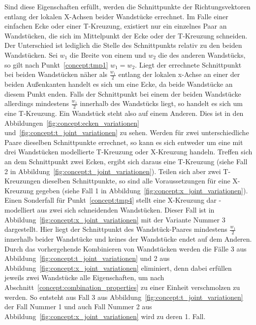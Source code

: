 Sind diese Eigenschaften erfüllt, werden die Schnittpunkte der Richtungsvektoren entlang der lokalen X-Achsen beider Wandstücke errechnet.
Im Falle einer einfachen Ecke oder einer T-Kreuzung, existiert nur ein einzelnes Paar an Wandstücken, die sich im Mittelpunkt der Ecke oder der T-Kreuzung schneiden.
Der Unterschied ist lediglich die Stelle des Schnittpunkts relativ zu den beiden Wandstücken.
Sei \(w_1\) die Breite von einem und \(w_2\) die des anderen Wandstücks, so gilt nach Punkt~\ref{concept:tmp1} \(w_1 = w_2\).
Liegt der errechnete Schnittpunkt bei beiden Wandstücken näher als \(\frac{w_1}{2}\) entlang der lokalen x-Achse an einer der beiden Außenkanten handelt es sich um eine Ecke, da beide Wandstücke an diesem Punkt enden.
Falls der Schnittpunkt bei einem der beiden Wandstücke allerdings mindestens  \(\frac{w_1}{2}\) innerhalb des Wandstücks liegt, so handelt es sich um eine T-Kreuzung.
Ein Wandstück steht also auf einem Anderen.
Dies ist in den Abbildungen~\ref{fig:concept:ecken_variationen} und~\ref{fig:concept:t_joint_variationen} zu sehen. 
Werden für zwei unterschiedliche Paare dieselben Schnittpunkte errechnet, so kann es sich entweder um eine mit drei Wandstücken modellierte T-Kreuzung oder X-Kreuzung handeln.
Treffen sich an dem Schnittpunkt zwei Ecken, ergibt sich daraus eine T-Kreuzung (siehe Fall 2 in Abbildung~\ref{fig:concept:t_joint_variationen}).
Teilen sich aber zwei T-Kreuzungen dieselben Schnittpunkte, so sind alle Voraussetzungen für eine X-Kreuzung gegeben (siehe Fall 1 in Abbildung~\ref{fig:concept:x_joint_variationen}).
Einen Sonderfall für Punkt~\ref{concept:tmp4} stellt eine X-Kreuzung dar - modelliert aus zwei sich schneidenden Wandstücken.
Dieser Fall ist in Abbildung~\ref{fig:concept:x_joint_variationen} mit der Variante Nummer 3 dargestellt.
Hier liegt der Schnittpunkt des Wandstück-Paares mindestens \(\frac{w_1}{2}\) innerhalb beider Wandstücke und keines der Wandstücke endet auf dem Anderen.
Durch das vorhergehende Kombinieren von Wandstücken werden die Fälle 3 aus Abbildung~\ref{fig:concept:t_joint_variationen} und 2 aus Abbildung~\ref{fig:concept:x_joint_variationen} eliminiert, denn dabei erfüllen jeweils zwei Wandstücke alle Eigenschaften, um nach Abschnitt~\ref{concept:combination_properties} zu einer Einheit verschmolzen zu werden.
So entsteht aus Fall 3 aus Abbildung~\ref{fig:concept:t_joint_variationen} der Fall Nummer 1 und auch Fall Nummer 2 aus Abbildung~\ref{fig:concept:x_joint_variationen} wird zu deren 1. Fall.

